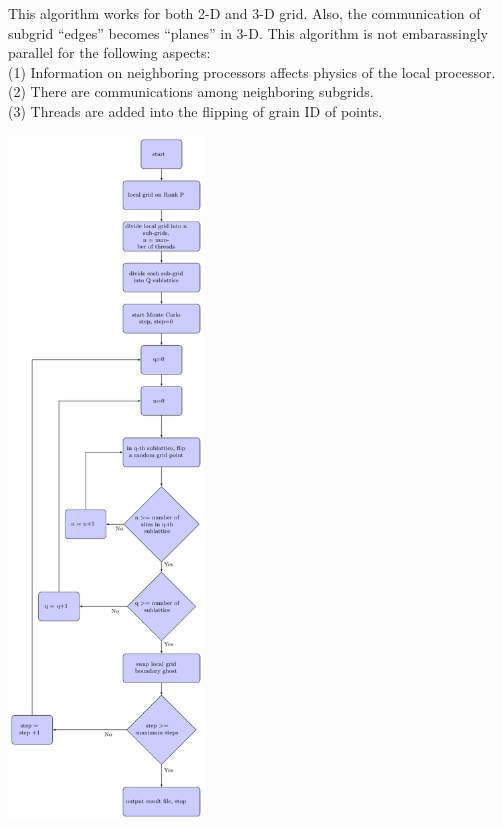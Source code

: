 \documentclass[11pt]{article}
\begin{document}
\begin{multicols*}{2}
This algorithm works for both 2-D and 3-D grid. Also, the communication of subgrid ``edges'' becomes ``planes'' in 3-D. 
This algorithm is not embarassingly parallel for the following aspects:\\
(1) Information on neighboring processors affects physics of the local processor. \\
(2) There are communications among neighboring subgrids.\\
(3) Threads are added into the flipping of grain ID of points.

\begin{center}
\begin{minipage}{0.475\textwidth}\centering
  \includegraphics[height=7.125in]{img/flow_chart.pdf}
\end{minipage}
\end{center}


\end{multicols*}
\end{document}
